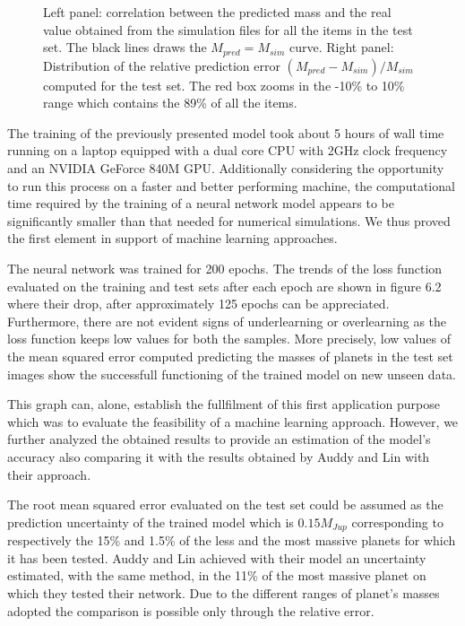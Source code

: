 \documentclass[a4paper,10pt]{report}
\begin{document}
\begin{figure}
    \begin{center}
        \scalebox{0.85}{}
    \end{center}
    \caption{Left panel: correlation between the predicted mass and the real value obtained from the simulation files
    for all the items in the test set. The black lines draws the $M_{pred} = M_{sim}$ curve.
    Right panel: Distribution of the relative prediction error $(M_{pred} - M_{sim})/M_{sim}$ computed for the test set. The red box 
    zooms in the -10\% to 10\% range which contains the 89\% of all the items.}
\end{figure}

The training of the previously presented model took about 5 hours of wall time running on a laptop equipped with a dual core CPU
with 2GHz clock frequency and an NVIDIA GeForce 840M GPU. Additionally considering the opportunity to run
this process on a faster and better performing machine, the computational time required by the training of a neural network
model appears to be significantly smaller than that needed for numerical simulations. We thus proved the
first element in support of machine learning approaches.

The neural network was trained for 200 epochs. The trends of the loss function evaluated on the training and test sets after each epoch are shown
in figure 6.2 where their drop, after approximately 125 epochs can be appreciated.
Furthermore, there are not evident signs of underlearning or overlearning as the loss function keeps low values for both the samples.
More precisely, low values of the mean squared error computed predicting the masses of planets in the test set images 
show the successfull functioning of the trained model on new unseen data.

This graph can, alone, establish the fullfilment of this first application purpose which was to evaluate the feasibility of
a machine learning approach. However, we further analyzed the obtained results to provide 
an estimation of the model's accuracy also comparing it with the results obtained by Auddy and Lin with their
approach. 

The root mean squared error evaluated on the test set could be assumed as the
prediction uncertainty of the trained model which is $0.15 M_{Jup}$ corresponding to respectively
the 15\% and 1.5\% of the less and the most massive planets
for which it has been tested. Auddy and Lin achieved with their model an uncertainty estimated, with the same method,
in the 11\% 
of the most massive planet on which they tested their network. 
Due to the different ranges of planet's masses adopted the comparison is possible only through the relative error.
\end{document}
